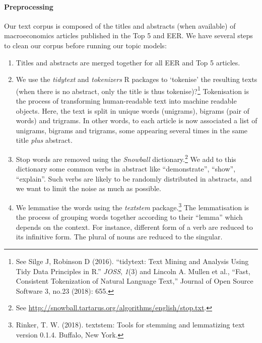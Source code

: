 \documentclass[
]{article}
\providecommand{\tightlist}{%
  \setlength{\itemsep}{0pt}\setlength{\parskip}{0pt}}
\begin{document}
\hypertarget{preprocessing}{%
\paragraph*{Preprocessing}\label{preprocessing}}

Our text corpus is composed of the titles and abstracts (when available)
of macroeconomics articles published in the Top 5 and EER. We have
several steps to clean our corpus before running our topic models:

\begin{enumerate}
\def\labelenumi{\arabic{enumi}.}
\tightlist
\item
  Titles and abstracts are merged together for all EER and Top 5
  articles.
\item
  We use the \emph{tidytext} and \emph{tokenizers} R packages to
  `tokenise' the resulting texts (when there is no abstract, only the
  title is thus tokenise)?\footnote{See Silge J, Robinson D (2016).
    ``tidytext: Text Mining and Analysis Using Tidy Data Principles in
    R.'' \emph{JOSS}, \emph{1}(3) and Lincoln A. Mullen et al., ``Fast,
    Consistent Tokenization of Natural Language Text,'' Journal of Open
    Source Software 3, no.23 (2018): 655.} Tokenisation is the process
  of transforming human-readable text into machine readable objects.
  Here, the text is split in unique words (unigrams), bigrams (pair of
  words) and trigrams. In other words, to each article is now associated
  a list of unigrams, bigrams and trigrams, some appearing several times
  in the same title \emph{plus} abstract.
\item
  Stop words are removed using the \emph{Snowball}
  dictionary.\footnote{See
    \url{http://snowball.tartarus.org/algorithms/english/stop.txt}.} We
  add to this dictionary some common verbs in abstract like
  ``demonstrate'', ``show'', ``explain''. Such verbs are likely to be
  randomly distributed in abstracts, and we want to limit the noise as
  much as possible.
\item
  We lemmatise the words using the \emph{textstem} package.\footnote{Rinker,
    T. W. (2018). textstem: Tools for stemming and lemmatizing text
    version 0.1.4. Buffalo, New York.} The lemmatisation is the process
  of grouping words together according to their ``lemma'' which depends
  on the context. For instance, different form of a verb are reduced to
  its infinitive form. The plural of nouns are reduced to the singular.
\end{enumerate}
\end{document}
